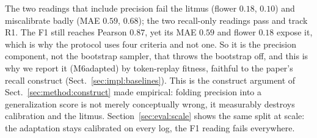 \documentclass[runningheads]{llncs}
\newcommand{\chg}[1]{\textcolor{chgblue}{#1}}
\begin{document}
The two readings that include precision fail the litmus (flower $0.18$, $0.10$) and miscalibrate badly (MAE $0.59$, $0.68$); the two recall-only readings pass and track R1. The F1 still reaches Pearson $0.87$, yet its MAE $0.59$ and flower $0.18$ expose it, which is why the protocol uses four criteria and not one. So it is the precision component, not the bootstrap sampler, that throws the bootstrap off, and this is why we report it (M6adapted) by token-replay fitness, faithful to the paper's recall construct (Sect.~\ref{sec:impl:baselines}). \chg{This is the construct argument of Sect.~\ref{sec:method:construct} made empirical: folding precision into a generalization score is not merely conceptually wrong, it measurably destroys calibration and the litmus. Section~\ref{sec:eval:scale} shows the same split at scale: the adaptation stays calibrated on every log, the F1 reading fails everywhere.}
\end{document}
